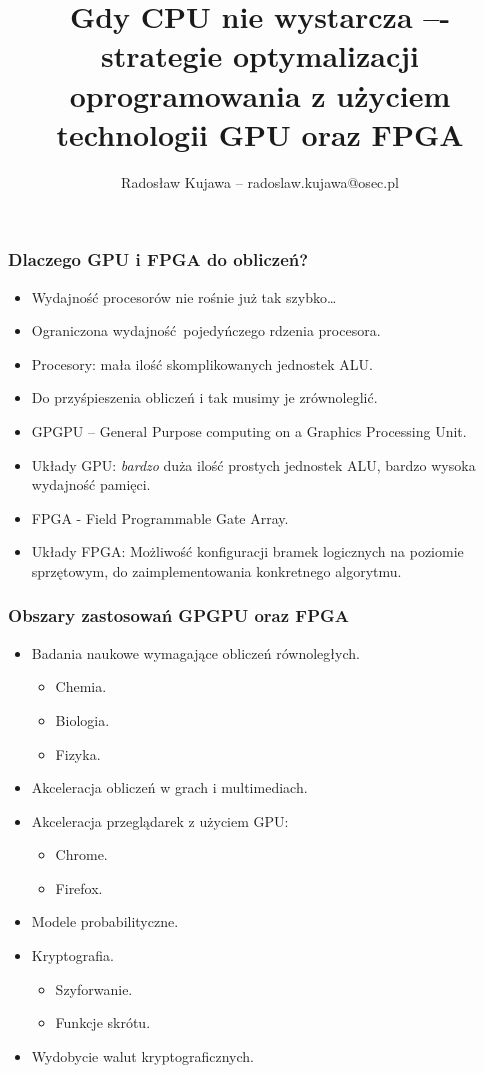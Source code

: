\documentclass[dvipsnames,table]{beamer}
\title{Gdy CPU nie wystarcza –- strategie optymalizacji oprogramowania z użyciem technologii GPU oraz FPGA}
\author{Radosław Kujawa -- radoslaw.kujawa@osec.pl}
\institute{OSEC}
\begin{document}
\begin{frame}
	\titlepage
\end{frame}

\begin{frame}
	\frametitle{Dlaczego GPU i FPGA do obliczeń?}
\begin{itemize}
	\item Wydajność procesorów nie rośnie już tak szybko\dots
	\item Ograniczona wydajność pojedyńczego rdzenia procesora.
	\item Procesory: mała ilość skomplikowanych jednostek ALU.
	\item Do przyśpieszenia obliczeń i tak musimy je zrównoleglić.
	\item GPGPU -- General Purpose computing on a Graphics Processing Unit. 
	\item Układy GPU: {\em bardzo} duża ilość prostych jednostek ALU, bardzo wysoka wydajność pamięci.
	\item FPGA - Field Programmable Gate Array.
	\item Układy FPGA: Możliwość konfiguracji bramek logicznych na poziomie sprzętowym, do zaimplementowania konkretnego algorytmu.
	
\end{itemize}
\end{frame}


\begin{frame}
	\frametitle{Obszary zastosowań GPGPU oraz FPGA} 
\begin{itemize}
	\item Badania naukowe wymagające obliczeń równoległych.
	\begin{itemize}
		\item Chemia.
		\item Biologia.
		\item Fizyka.
	\end{itemize}
	\item Akceleracja obliczeń w grach i multimediach.
	\item Akceleracja przeglądarek z użyciem GPU:
	\begin{itemize}
		\item Chrome.
		\item Firefox.
	\end{itemize}
	\item Modele probabilityczne.
	\item Kryptografia.
	\begin{itemize}
		\item Szyforwanie.
		\item Funkcje skrótu.
	\end{itemize}
	\item Wydobycie walut kryptograficznych.
\end{itemize}
\end{frame}
\end{document}
